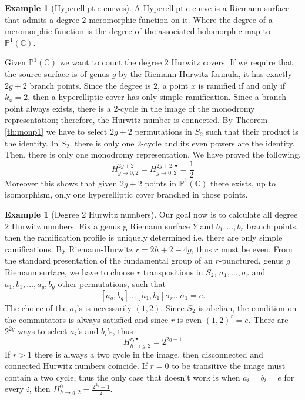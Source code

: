 \documentclass[12pt,a4paper,openright,twoside]{report}
\theoremstyle{definition} %
\newtheorem{example}[theorem]{Example}
\def \C {\mathbb{C}}
\def \PP {\mathbb{P}^1(\C)}
\begin{document}
\begin{example}[Hyperelliptic curves]
A Hyperelliptic curve is a Riemann surface that admits a degree \(2\) meromorphic function on it. Where the degree of a meromorphic function is the degree of the associated holomorphic map to \(\PP\).

Given \(\PP\) we want to count the degree \(2\) Hurwitz covers. If we require that the source surface is of genus \(g\) by the Riemann-Hurwitz formula, it has exactly \(2g+2\) branch points. Since the degree is \(2\), a point \(x\) is ramified if and only if \(k_x = 2\), then a hyperelliptic cover has only simple ramification. Since a branch point always exists, there is a 2-cycle in the image of the monodromy representation; therefore, the Hurwitz number is connected. By Theorem \ref{th:monp1} we have to select \(2g+2\) permutations in \(S_2\) such that their product is the identity. In \(S_2\), there is only one \(2\)-cycle and its even powers are the identity. Then, there is only one monodromy representation. We have proved the following.
\[
H_{g \to 0, 2}^{2g+2}= H_{g \to 0, 2}^{2g+2, \bullet} = \frac{1}{2}
\]
Moreover this shows that given \(2g+2\) points in \(\PP\) there exists, up to isomorphism, only one hyperelliptic cover branched in those points.
\end{example}

\begin{example}[Degree 2 Hurwitz numbers]
    Our goal now is to calculate all degree \(2\) Hurwitz numbers. Fix a genus g Riemann surface \(Y\) and \(b_1, \ldots, b_r\) branch points, then the ramification profile is uniquely determined i.e. there are only simple ramifications. By Riemann-Hurwitz \(r= 2h+2-4g\), thus \(r\) must be even. From the standard presentation of the fundamental group of an \(r\)-punctured, genus \(g\) Riemann surface, we have to choose \(r\) transpositions in \(S_2\), \(\sigma_1, \ldots, \sigma_r\) and \(a_1,b_1, \ldots, a_g,b_g\) other permutations, such that
    \[
    [a_g,b_g] \ldots [a_1,b_1] \sigma_r \ldots \sigma_1 = e.
    \]
    The choice of the \(\sigma_i\)'s is necessarily \((1,2)\). Since \(S_2\) is abelian, the condition on the commutators is always satisfied and since \(r\) is even \((1,2)^r = e\).
    There are \(2^{2g}\) ways to select \(a_i\)'s and \(b_i\)'s, thus
    \[
    H^{r,\bullet}_{h \to g,2}= 2^{2g-1}
    \]
    If \(r>1\) there is always a two cycle in the image, then disconnected and connected Hurwitz numbers coincide. If \(r=0\) to be transitive the image must contain a two cycle, thus the only case that doesn't work is when \(a_i = b_i = e\) for every \(i\), then \(H^0_{h \to g,2} = \frac{2^{2g}-1}{2}\).
\end{example}
\end{document}
